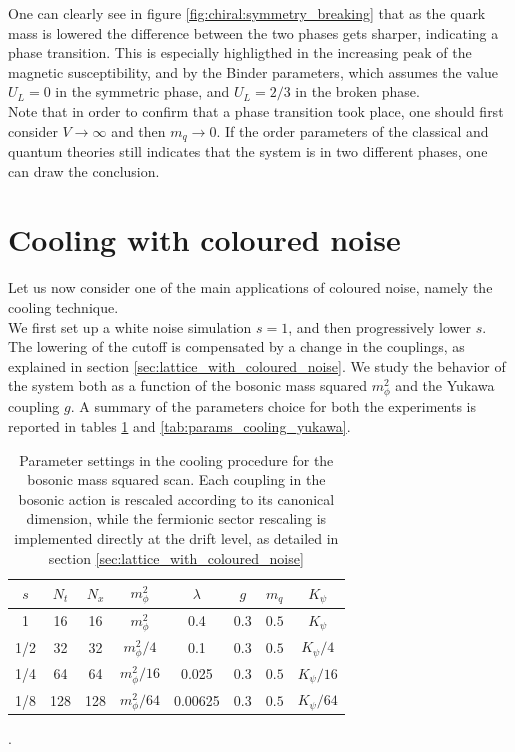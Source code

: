 One can clearly see in figure \ref{fig:chiral:symmetry_breaking} that as the quark  mass is lowered the difference between the two phases gets sharper, indicating a phase transition. 
This is especially highligthed in the increasing peak of the magnetic susceptibility, and by the Binder parameters, which assumes the value $U_L = 0$ in the symmetric phase, and $U_L=2/3$ in the broken phase. \\
Note that in order to confirm that a phase transition took place, one should first consider $V \to \infty$ and then $m_q \to 0$. If the order parameters of the classical and quantum theories still indicates that the system is 
in two different phases, one can draw the conclusion.

\newpage

\section{Cooling with coloured noise}
Let us now consider one of the main applications of coloured noise, namely the cooling technique. \\
We first set up a white noise simulation $s=1$, and then progressively lower $s$. The lowering of the cutoff is compensated by a change in the couplings, as explained in section \ref{sec:lattice_with_coloured_noise}. 
We study the behavior of the system both as a function of the bosonic mass squared $m_\phi^2$ and the Yukawa coupling $g$. 
A summary of the parameters choice for both the experiments is reported in tables \ref{tab:params_cooling} and \ref{tab:params_cooling_yukawa}. \\
\begin{table}[htp]
    \centering
    \begin{tabular}{cccccccc}
        \toprule
        $s$ & $N_t$ & $N_x$ & $m_\phi^2$ & $\lambda$ & $g$ & $m_q$& $K_\psi$ \\
        \midrule 
        1 & 16 & 16 & $m_\phi^2$ & 0.4 & 0.3 & $0.5$ & $K_\psi$ \\
        1/2 & 32 & 32 & $m_\phi^2/4$ & 0.1 & 0.3 & $0.5$ & $K_\psi/4$ \\
        1/4 & 64 & 64 & $m_\phi^2/16$ & 0.025 & 0.3 & $0.5$ & $K_\psi/16$ \\
        1/8 & 128 & 128 & $m_\phi^2/64$ & 0.00625 & 0.3 & $0.5$ & $K_\psi/64$ \\
        \bottomrule
    \end{tabular}
    \caption[Parameter settings in the cooling procedure for the Bosonic mass squared scan]{Parameter settings in the cooling procedure for the bosonic mass squared scan. Each coupling in the bosonic action is rescaled according to its canonical dimension, while the fermionic sector rescaling is implemented directly at the drift level, as detailed in section \ref{sec:lattice_with_coloured_noise}}.
    \label{tab:params_cooling}
\end{table}
